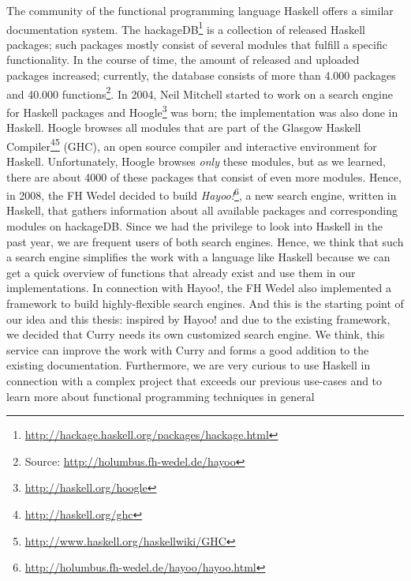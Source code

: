 \documentclass[%
	latex,%
	a4paper,%
	oneside,%
	chapterprefix,%
	headsepline,%
	12pt%
]{scrbook}
\begin{document}
The community of the functional programming language Haskell\cite{haskellreport} offers a
similar documentation system. %
The
hackageDB\footnote{\url{http://hackage.haskell.org/packages/hackage.html}}
is a collection of released Haskell packages; such packages mostly
consist of several modules that fulfill a specific functionality. %
In the course of time, the amount of released and uploaded packages
increased; currently, the database consists of more than 4.000
packages and 40.000 functions\footnote{Source:
  \url{http://holumbus.fh-wedel.de/hayoo}}. %
In 2004, Neil Mitchell started to work on a search engine for Haskell
packages and Hoogle\footnote{\url{http://haskell.org/hoogle}} was
born; the implementation was also done in Haskell. %
Hoogle browses all modules that are part of the Glasgow Haskell
Compiler\footnote{\url{http://haskell.org/ghc}}\footnote{\url{http://www.haskell.org/haskellwiki/GHC}}
(GHC), an open source compiler and interactive environment for
Haskell. %
Unfortunately, Hoogle browses \emph{only} these modules, but as we
learned, there are about 4000 of these packages that consist of even
more modules. %
Hence, in 2008, the FH Wedel decided to build
\emph{Hayoo!}\footnote{\url{http://holumbus.fh-wedel.de/hayoo/hayoo.html}},
a new search engine, written in Haskell, that gathers information
about all available packages and corresponding modules on hackageDB. %
Since we had the privilege to look into Haskell in the past year, we
are frequent users of both search engines. %
Hence, we think that such a search engine simplifies the work with a
language like Haskell because we can get a quick overview of functions
that already exist and use them in our implementations. %
In connection with Hayoo!, the FH Wedel also implemented a framework
to build highly-flexible search engines. %
And this is the starting point of our idea and this thesis: inspired
by Hayoo! and due to the existing framework, we decided that Curry
needs its own customized search engine. %
We think, this service can improve the work with Curry and forms a
good addition to the existing documentation. %
Furthermore, we are very curious to use Haskell in connection with a
complex project that exceeds our previous use-cases and to learn more
about functional programming techniques in general %
\end{document}
